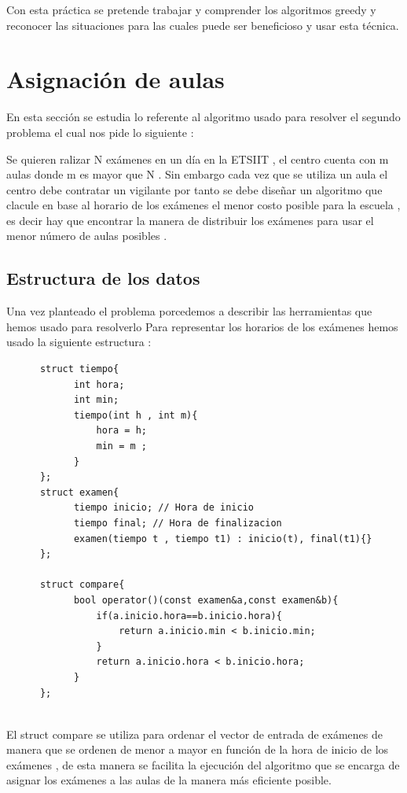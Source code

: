 \documentclass[11pt,openany]{book}
\begin{document}
Con esta práctica se pretende trabajar y comprender los algoritmos greedy y  reconocer las situaciones para las cuales puede 
ser beneficioso y usar esta técnica.
\chapter{Asignación de aulas}
En esta sección se estudia lo referente al algoritmo usado para resolver el segundo 
problema el cual nos pide lo siguiente :

Se quieren ralizar N exámenes en un día en la ETSIIT , el centro cuenta con m aulas donde m es mayor
que N . Sin embargo cada vez que se utiliza un aula el centro debe contratar un vigilante por tanto 
se debe diseñar un algoritmo que clacule en base al horario de los exámenes el menor costo posible 
para la escuela , es decir hay que encontrar la manera de distribuir los exámenes para usar el menor número
de aulas posibles .

\section{Estructura de los datos}
Una vez planteado el problema porcedemos a describir las herramientas que hemos usado para resolverlo 
Para representar los horarios de los exámenes hemos usado la siguiente estructura :

\begin{lstlisting}
      struct tiempo{
            int hora;
            int min;
            tiempo(int h , int m){
                hora = h;
                min = m ;
            }
      };
      struct examen{
            tiempo inicio; // Hora de inicio
            tiempo final; // Hora de finalizacion
            examen(tiempo t , tiempo t1) : inicio(t), final(t1){}
      };
        
      struct compare{
            bool operator()(const examen&a,const examen&b){
                if(a.inicio.hora==b.inicio.hora){
                    return a.inicio.min < b.inicio.min;
                }
                return a.inicio.hora < b.inicio.hora;
            }
      };
        
\end{lstlisting}

El struct compare se utiliza para ordenar el vector de entrada de exámenes de manera que se ordenen
de menor a mayor en función de la hora de inicio de los exámenes , de esta manera se facilita la
ejecución del algoritmo que se encarga de asignar los exámenes a las aulas de la manera más eficiente
posible.
\end{document}
